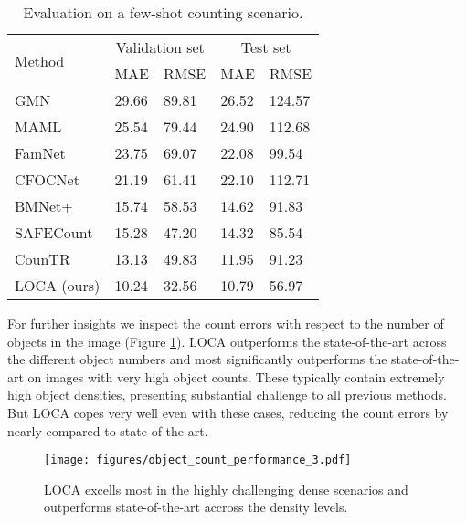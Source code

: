 \documentclass[10pt,twocolumn,letterpaper]{article}
\newcommand*\circledd[1]{\tikz[baseline=(char.base)]{
            \node[shape=circle,draw,inner sep=0.15pt] (char) {#1};}}
\newcommand{\first}[1]{{#1\raisebox{0.8pt}{\footnotesize \color{gold} \circledd{1}}}}
\newcommand{\second}[1]{{#1\raisebox{0.8pt}{\footnotesize \color{silver} \circledd{2}}}}
\newcommand{\third}[1]{{#1\raisebox{0.8pt}{\footnotesize \color{bronze} \circledd{3}}}}
\begin{document}
\begin{table}[htbp]
    \centering
    \begin{tabular}{l l l l l}\toprule
        \multirow{2}{*}{Method}& \multicolumn{2}{c}{Validation set} & \multicolumn{2}{c}{Test set} \\
        & MAE & RMSE & MAE & RMSE \\ 
        \midrule
        GMN~\cite{gmnclass} & 29.66 & 89.81 & 26.52 & 124.57 \\
        MAML~\cite{maml} & 25.54 & 79.44 & 24.90 & 112.68 \\
        FamNet~\cite{famnet} & 23.75 & 69.07 & 22.08 & 99.54 \\
        CFOCNet~\cite{cfocnet} & 21.19 & 61.41 & 22.10 & 112.71 \\        
        BMNet+~\cite{bmnet} & 15.74 & 58.53 & 14.62 & 91.83 \\
        SAFECount~\cite{safecount} & \third{15.28} & \second{47.20} & \third{14.32} & \second{85.54} \\
        CounTR~\cite{countr} & \second{13.13} & \third{49.83} & \second{11.95} & \third{91.23} \\
        LOCA (ours) & \first{10.24} & \first{32.56} & \first{10.79} & \first{56.97} \\
        \bottomrule
    \end{tabular}
    \caption{Evaluation on a few-shot counting scenario.}
    \label{tab:results_fs}
\end{table}

For further insights we inspect the count errors with respect to the number of objects in the image (Figure \ref{fig:obj_count}).
LOCA outperforms the state-of-the-art across the different object numbers and most significantly outperforms the state-of-the-art on images with very high object counts. These typically contain extremely high object densities, presenting substantial challenge to all previous methods. But LOCA copes very well even with these cases, reducing the count errors by nearly  compared to state-of-the-art.



\begin{figure}
    \centering
    \texttt{[image: figures/object\_count\_performance\_3.pdf]}
    \caption{LOCA excells most in the highly challenging dense scenarios and outperforms state-of-the-art accross the density levels.
}
    \label{fig:obj_count}
\end{figure}
\end{document}

